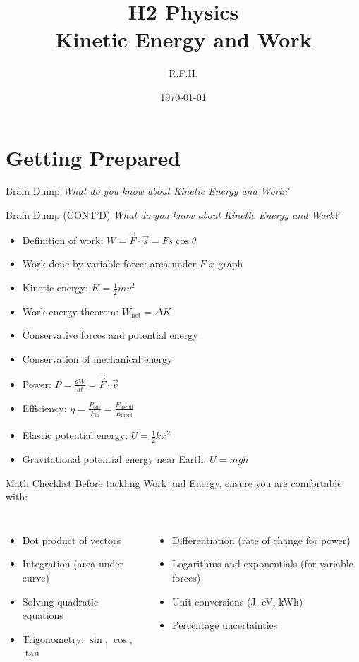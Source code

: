 \documentclass[11pt]{beamer}
\title{H2 Physics \\ Kinetic Energy and Work}
\author{R.F.H.}
\date{\today}
\begin{document}
\begin{frame}
\titlepage
\end{frame}

\section{Getting Prepared}

\begin{frame}[shrink=15]{Brain Dump}
\centering
\Large
\textit{What do you know about Kinetic Energy and Work?}
\vfill
\end{frame}

\begin{frame}[shrink=15]{Brain Dump (CONT'D)}
\centering
\Large
\textit{What do you know about Kinetic Energy and Work?}
\vfill
\begin{itemize}
    \item Definition of work: $W = \vec{F} \cdot \vec{s} = F s \cos\theta$
    \item Work done by variable force: area under $F$-$x$ graph
    \item Kinetic energy: $K = \frac12 m v^2$
    \item Work-energy theorem: $W_{\text{net}} = \Delta K$
    \item Conservative forces and potential energy
    \item Conservation of mechanical energy
    \item Power: $P = \frac{dW}{dt} = \vec{F} \cdot \vec{v}$
    \item Efficiency: $\eta = \frac{P_{\text{out}}}{P_{\text{in}}} = \frac{E_{\text{useful}}}{E_{\text{input}}}$
    \item Elastic potential energy: $U = \frac12 k x^2$
    \item Gravitational potential energy near Earth: $U = mgh$
\end{itemize}
\end{frame}

\begin{frame}{Math Checklist}
Before tackling Work and Energy, ensure you are comfortable with:
\begin{columns}[T]
\begin{itemize}
    \item Dot product of vectors
    \item Integration (area under curve)
    \item Solving quadratic equations
    \item Trigonometry: $\sin$, $\cos$, $\tan$
\end{itemize}
\begin{itemize}
    \item Differentiation (rate of change for power)
    \item Logarithms and exponentials (for variable forces)
    \item Unit conversions (J, eV, kWh)
    \item Percentage uncertainties
\end{itemize}
\end{columns}
\end{frame}
\end{document}
